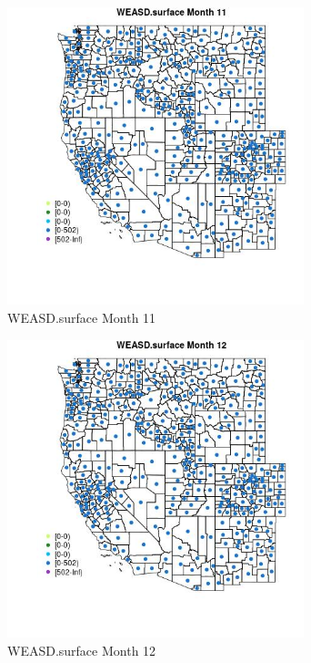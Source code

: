\begin{figure} 
\centering  
\includegraphics[width=0.77\textwidth]{Code_Outputs/df_report_ML_predictors_CountyCentroid_Locations_Dates_2008-01-01to2018-12-31_MapObsMo11WEASDsurface.jpg} 
\caption{\label{fig:df_report_ML_predictors_CountyCentroid_Locations_Dates_2008-01-01to2018-12-31MapObsMo11WEASDsurface}WEASD.surface Month 11} 
\end{figure} 
 

\begin{figure} 
\centering  
\includegraphics[width=0.77\textwidth]{Code_Outputs/df_report_ML_predictors_CountyCentroid_Locations_Dates_2008-01-01to2018-12-31_MapObsMo12WEASDsurface.jpg} 
\caption{\label{fig:df_report_ML_predictors_CountyCentroid_Locations_Dates_2008-01-01to2018-12-31MapObsMo12WEASDsurface}WEASD.surface Month 12} 
\end{figure} 
 

